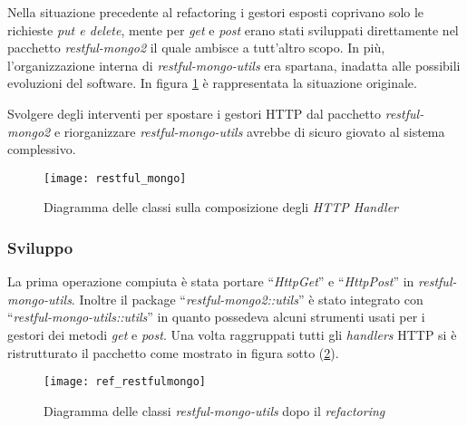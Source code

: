 Nella situazione precedente al \gls{refactoring} i gestori esposti coprivano
solo le richieste \textit{put e delete}, mente per \textit{get} e \textit{post}
erano stati sviluppati direttamente nel pacchetto \textit{restful-mongo2} il
quale ambisce a tutt'altro scopo. In più, l'organizzazione interna di
\textit{restful-mongo-utils} era spartana, inadatta alle possibili evoluzioni
del software. In figura \ref{fig:restful_mongo} è rappresentata la situazione
originale.

Svolgere degli interventi per spostare i gestori HTTP dal pacchetto
\textit{restful-mongo2} e riorganizzare \textit{restful-mongo-utils} avrebbe
di sicuro giovato al sistema complessivo.

\begin{figure}[H]
\begin{center}
\texttt{[image: restful\_mongo]}
\caption{
Diagramma delle classi sulla composizione degli \textit{HTTP Handler}
}
\label{fig:restful_mongo}
\end{center}
\end{figure}

\subsubsection{Sviluppo}
La prima operazione compiuta è stata portare ``\textit{HttpGet}'' e
``\textit{HttpPost}'' in \textit{restful-mongo-utils}. Inoltre il package
``\textit{restful-mongo2::utils}'' è stato integrato con
``\textit{restful-mongo-utils::utils}'' in quanto possedeva alcuni strumenti
usati per i gestori dei metodi \textit{get} e \textit{post}. Una volta
raggruppati tutti gli \textit{handlers} HTTP si è ristrutturato il pacchetto
come mostrato in figura sotto (\ref{fig:ref_restfulmongo}).

\begin{figure}[H]
\begin{center}
\texttt{[image: ref\_restfulmongo]}
\caption{
Diagramma delle classi \textit{restful-mongo-utils} dopo il \textit{refactoring}
}
\label{fig:ref_restfulmongo}
\end{center}
\end{figure}

